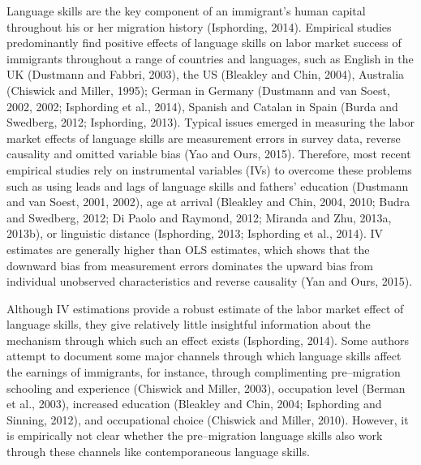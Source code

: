 \documentclass[12pt,a4paper]{article}
\begin{document}
Language skills are the key component of an immigrant's human capital throughout his or her migration history  (Isphording, 2014). Empirical studies predominantly find positive effects of language skills on labor market success of immigrants throughout a range of countries and languages, such as English in the UK (Dustmann and Fabbri, 2003), the US (Bleakley and Chin, 2004), Australia (Chiswick and Miller, 1995); German in Germany (Dustmann and van Soest, 2002, 2002; Isphording et al., 2014), Spanish and Catalan in Spain (Burda and Swedberg, 2012; Isphording, 2013). Typical issues emerged in measuring the labor market effects of language skills are measurement errors in survey data, reverse causality and omitted variable bias (Yao and Ours, 2015). Therefore, most recent empirical studies rely on instrumental variables (IVs) to overcome these problems such as using leads and lags of language skills and fathers' education (Dustmann and van Soest, 2001, 2002), age at arrival (Bleakley and Chin, 2004, 2010; Budra and Swedberg, 2012; Di Paolo and Raymond, 2012; Miranda and Zhu, 2013a, 2013b), or linguistic distance (Isphording, 2013; Isphording et al., 2014). IV estimates are generally higher than OLS estimates, which shows that the downward bias from measurement errors dominates the upward bias from individual unobserved characteristics and reverse causality (Yan and Ours, 2015).

Although IV estimations provide a robust estimate of the labor market effect of language skills, they give relatively little insightful information about the mechanism through which such an effect exists (Isphording, 2014). Some authors attempt to document some major channels through which language skills affect the earnings of immigrants, for instance, through complimenting pre--migration schooling and experience (Chiswick and Miller, 2003), occupation level (Berman et al., 2003), increased education (Bleakley and Chin, 2004; Isphording and Sinning, 2012), and occupational choice (Chiswick and Miller, 2010). However, it is empirically not clear whether the pre--migration language skills also work through these channels like contemporaneous language skills.


\end{document}
